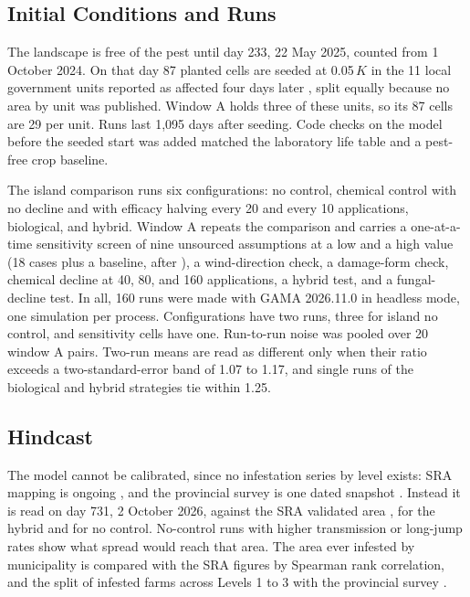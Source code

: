 \documentclass[conference]{IEEEtran}
\begin{document}
\subsection{Initial Conditions and Runs}

The landscape is free of the pest until day 233, 22 May 2025, counted from 1 October 2024. On that day 87 planted cells are seeded at 0.05\,$K$ in the 11 local government units reported as affected four days later \cite{Guadalquiver2025}, split equally because no area by unit was published. Window A holds three of these units, so its 87 cells are 29 per unit. Runs last 1,095 days after seeding. Code checks on the model before the seeded start was added matched the laboratory life table and a pest-free crop baseline.

The island comparison runs six configurations: no control, chemical control with no decline and with efficacy halving every 20 and every 10 applications, biological, and hybrid. Window A repeats the comparison and carries a one-at-a-time sensitivity screen of nine unsourced assumptions at a low and a high value (18 cases plus a baseline, after \cite{Alves2026}), a wind-direction check, a damage-form check, chemical decline at 40, 80, and 160 applications, a hybrid test, and a fungal-decline test. In all, 160 runs were made with GAMA 2026.11.0 in headless mode, one simulation per process. Configurations have two runs, three for island no control, and sensitivity cells have one. Run-to-run noise was pooled over 20 window A pairs. Two-run means are read as different only when their ratio exceeds a two-standard-error band of 1.07 to 1.17, and single runs of the biological and hybrid strategies tie within 1.25.

\subsection{Hindcast}

The model cannot be calibrated, since no infestation series by level exists: SRA mapping is ongoing \cite{SRA2026FOI}, and the provincial survey is one dated snapshot \cite{PGNO2026}. Instead it is read on day 731, 2 October 2026, against the SRA validated area \cite{SRA2026FOI}, for the hybrid and for no control. No-control runs with higher transmission or long-jump rates show what spread would reach that area. The area ever infested by municipality is compared with the SRA figures by Spearman rank correlation, and the split of infested farms across Levels 1 to 3 with the provincial survey \cite{PGNO2026}.
\end{document}
